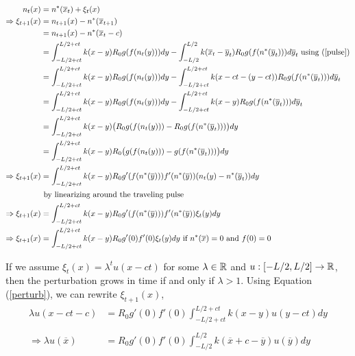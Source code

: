 \documentclass[12pt,english]{article}
\begin{document}
\begin{align}
n_t(x)&=n^*(\overline{x}_t)+\xi_t(x) \notag
\\ \Rightarrow \xi_{t+1}(x)&=n_{t+1}(x)-n^*(\overline{x}_{t+1}) \notag
\\&=n_{t+1}(x)-n^*(\overline{x}_{t}-c) \notag
\\ &=\int_{-L/2+ct}^{L/2+ct}k(x-y)R_0g(f(n_t(y)))dy-\int_{-L/2}^{L/2}k(\overline{x}_{t}-\overline{y}_t)R_0g(f(n^*(\overline{y}_t)))d\overline y_t \text{ using (\ref{pulse})} \notag
\\ &=\int_{-L/2+ct}^{L/2+ct}k(x-y)R_0g(f(n_t(y)))dy-\int_{-L/2+ct}^{L/2+ct}k(x-ct-(y-ct))R_0g(f(n^*(\overline{y}_t)))d\overline y_t \notag
\\ &=\int_{-L/2+ct}^{L/2+ct}k(x-y)R_0g(f(n_t(y)))dy-\int_{-L/2+ct}^{L/2+ct}k(x-y)R_0g(f(n^*(\overline{y}_t)))d\overline y_t \notag
\\ &=\int_{-L/2+ct}^{L/2+ct}k(x-y)\big(R_0g(f(n_t(y)))-R_0g(f(n^*(\overline{y}_t)))\big)dy \notag
\\ &=\int_{-L/2+ct}^{L/2+ct}k(x-y)R_0\big(g(f(n_t(y)))-g(f(n^*(\overline{y}_t)))\big)dy \notag
\\ \Rightarrow \xi_{t+1}(x)&=\int_{-L/2+ct}^{L/2+ct}k(x-y)R_0g'(f(n^*(\overline{y})))f'(n^*(\overline{y}))(n_t(y)-n^*(\overline{y}_t))dy \notag
\\& \text{ by linearizing around the traveling pulse} \notag
\\ \Rightarrow \xi_{t+1}(x)&=\int_{-L/2+ct}^{L/2+ct}k(x-y)R_0g'(f(n^*(\overline{y})))f'(n^*(\overline{y}))\xi_t(y)dy \notag
\\ \Rightarrow \xi_{t+1}(x)&=\int_{-L/2+ct}^{L/2+ct}k(x-y)R_0g'(0)f'(0)\xi_t(y)dy \text{ if $n^*(\overline{x})=0$ and $f(0)=0$} \label{perturb}
\end{align}


If we assume $\xi_t(x)=\lambda^tu(x-ct)$ for some $\lambda\in{\mathbb{R}}$ and $u:[-L/2,L/2]\to{\mathbb{R}}$, then the perturbation grows in time if and only if $\lambda >1$.  Using Equation (\ref{perturb}), we can rewrite $\xi_{t+1}(x)$,
\begin{align*}
\lambda u(x-ct-c)&=R_0g'(0)f'(0)\int_{-L/2+ct}^{L/2+ct}k(x-y)u(y-ct)dy
\\ \\\Rightarrow \lambda u(\overline{x})&=R_0g'(0)f'(0)\int_{-L/2}^{L/2}k(\overline{x}+c-\overline{y})u(\overline{y})dy
\end{align*}
\end{document}
